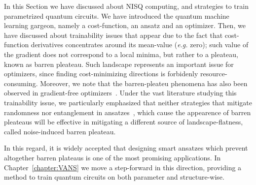 In this Section we have discussed about NISQ computing, and strategies to train parametrized quantum circuits. We have introduced the quantum machine learning gargeon, namely a cost-function, an ansatz and an optimizer. Then, we have discussed about trainability issues that appear due to the fact that cost-function derivatives concentrates around its mean-value (\textit{e.g.} zero); such value of the gradient does not correspond to a local minima, but rather to a pleateau, known as barren pleateau. Such landscape represents an important issue for optimizers, since finding cost-minimizing directions is forbidenly resource-consuming. Moreover, we note that the barren-pleateu phenomena has also been observed in gradient-free optimizers~\cite{arrasmith2020effect}. Under the vast literature studying this trainability issue, we particularly emphasized that neither strategies that mitigate randomness nor entanglement in ansatzes~\cite{verdon2019learning,volkoff2021large,skolik2020layerwise,grant2019initialization,pesah2020absence,zhang2020toward,bharti2020quantum,cerezo2020variational}, which cause the appearence of barren pleateaus will be effective in mitigating a different source of landscape-flatness, called noise-induced barren pleateau.

In this regard, it is widely accepted that designing smart ansatzes which prevent altogether barren plateaus is one of the most promising applications. In Chapter~\ref{chapter:VANS} we move a step-forward in this direction, providing a method to train quantum circuits on both parameter and structure-wise.
%
